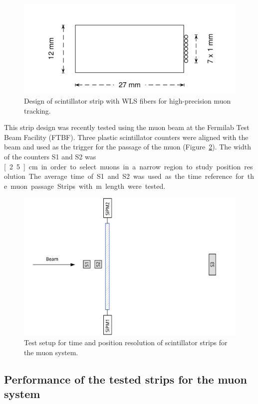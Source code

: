 \begin{figure}
  \centering
  \includegraphics[width=.6\textwidth]{MuonDetector/Scintillator/bicron}
  \caption{\label{fig:design} Design of scintillator strip with WLS fibers
  for high-precision muon tracking.}
\end{figure}

This strip design was recently tested using the muon beam at the Fermilab Test Beam Facility (FTBF). Three plastic scintillator counters were aligned with the beam and used as the trigger for the passage of the muon (Figure~\ref{fig:setup}). The width of the counters \textsf{S1} and \textsf{S2} was \unit[2.5]{cm} in order to select muons in a narrow region to study position resolution. The average time of \textsf{S1} and \textsf{S2} was used as the time reference for the muon passage. Strips with \unit[1]{m} length were tested.

\begin{figure}[h!]
  \centering
  \includegraphics[width=.9\textwidth]{MuonDetector/Scintillator/setup}
  \caption{\label{fig:setup} Test setup for time and position resolution of scintillator strips for the muon system.}
\end{figure}


\subsection{Performance of the tested strips for the muon system}

